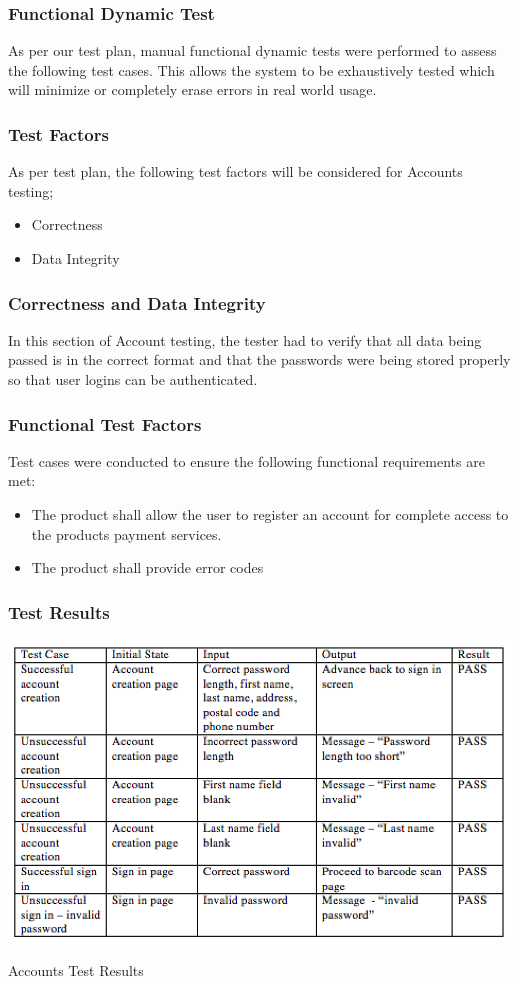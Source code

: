 \documentclass[12pt, titlepage]{article}
\begin{document}
\subsubsection{Functional Dynamic Test}
As per our test plan, manual functional dynamic tests 
were performed to assess the following test cases. This allows the system to be exhaustively tested which will minimize or completely erase errors in real world usage.
\subsubsection{Test Factors}
As per test plan, the following test factors will be considered for Accounts testing;

\begin{itemize}
 \item Correctness
 \item Data Integrity
 \end{itemize} 
 
\subsubsection{Correctness and Data Integrity}
In this section of Account testing, the tester had to verify that all data being passed is in the correct format and that the passwords were being stored properly so that user logins can be authenticated. 

\subsubsection{Functional Test Factors}
Test cases were conducted to ensure the following functional requirements are met:
\begin{itemize}
 \item The product shall allow the user to register an account for complete access to the products payment services.
 \item The product shall provide error codes
 \end{itemize}

\subsubsection{Test Results}
\break
\begin{table}[h]
\includegraphics[width=1.2\textwidth]{accountTC.png}
  \caption{Accounts Test Results}
\end{table}
\end{document}
